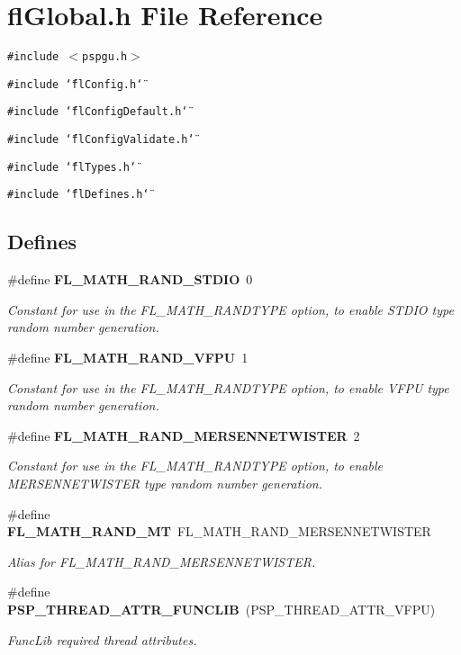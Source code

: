 \section{fl\-Global.h File Reference}
\label{flGlobal_8h}
{\tt \#include $<$pspgu.h$>$}\par
{\tt \#include \char`\"{}fl\-Config.h\char`\"{}}\par
{\tt \#include \char`\"{}fl\-Config\-Default.h\char`\"{}}\par
{\tt \#include \char`\"{}fl\-Config\-Validate.h\char`\"{}}\par
{\tt \#include \char`\"{}fl\-Types.h\char`\"{}}\par
{\tt \#include \char`\"{}fl\-Defines.h\char`\"{}}\par
\subsection*{Defines}
\begin{CompactItemize}
\item 
\#define {\bf FL\_\-MATH\_\-RAND\_\-STDIO}~0
\begin{CompactList}\small\item\em Constant for use in the FL\_\-MATH\_\-RANDTYPE option, to enable STDIO type random number generation. \item\end{CompactList}\item 
\#define {\bf FL\_\-MATH\_\-RAND\_\-VFPU}~1
\begin{CompactList}\small\item\em Constant for use in the FL\_\-MATH\_\-RANDTYPE option, to enable VFPU type random number generation. \item\end{CompactList}\item 
\#define {\bf FL\_\-MATH\_\-RAND\_\-MERSENNETWISTER}~2
\begin{CompactList}\small\item\em Constant for use in the FL\_\-MATH\_\-RANDTYPE option, to enable MERSENNETWISTER type random number generation. \item\end{CompactList}\item 
\#define {\bf FL\_\-MATH\_\-RAND\_\-MT}~FL\_\-MATH\_\-RAND\_\-MERSENNETWISTER
\begin{CompactList}\small\item\em Alias for FL\_\-MATH\_\-RAND\_\-MERSENNETWISTER. \item\end{CompactList}\item 
\#define {\bf PSP\_\-THREAD\_\-ATTR\_\-FUNCLIB}~(PSP\_\-THREAD\_\-ATTR\_\-VFPU)
\begin{CompactList}\small\item\em Func\-Lib required thread attributes. \item\end{CompactList}\end{CompactItemize}


